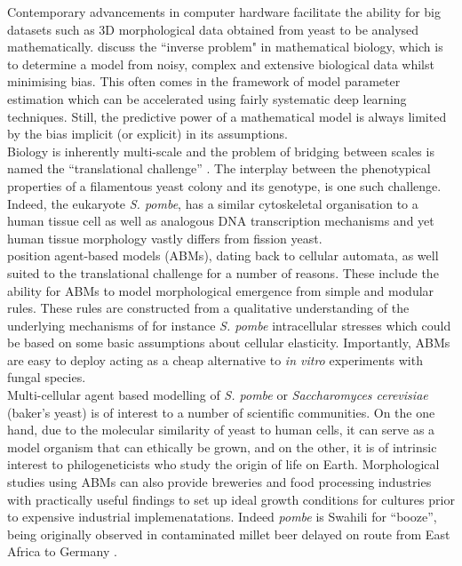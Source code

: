 Contemporary advancements in computer hardware facilitate 
the ability for big datasets such as 3D morphological data 
obtained from yeast to be analysed mathematically. \cite{clermont2015inverse} 
discuss the ``inverse problem" in mathematical biology, which is to determine a model 
from noisy, complex and extensive biological data whilst minimising bias. This often 
comes in the framework of model parameter estimation which 
can be accelerated using fairly systematic deep learning techniques. Still, the predictive power
of a mathematical model is always limited by the bias implicit (or explicit) in its assumptions.
\\

Biology is inherently multi-scale and the problem 
of bridging between scales is named the ``translational challenge'' \cite{an2009agent}.
The interplay between the phenotypical properties of a filamentous yeast colony and 
its genotype, is one such challenge. Indeed, the eukaryote \textit{S. pombe}, has a similar 
cytoskeletal organisation to a human tissue cell as well as analogous DNA transcription mechanisms 
\cite{hoffman2015ancient} and yet human tissue 
morphology vastly differs from fission yeast.
\\

\cite{an2009agent} position agent-based models (ABMs), dating back to cellular automata, as well suited to the 
translational challenge for a number of reasons. These include the ability 
for ABMs to model morphological emergence from simple and modular rules. These rules 
are constructed from a qualitative understanding of the underlying mechanisms of for instance 
\textit{S. pombe} intracellular stresses which could be based on some basic assumptions
about cellular elasticity. Importantly, ABMs are easy to deploy acting 
as a cheap alternative to \textit{in vitro} experiments with fungal species.
\\

Multi-cellular agent based modelling of \textit{S. pombe} or
\textit{Saccharomyces cerevisiae} (baker's yeast) is of interest to a number of scientific  
communities. On the one hand, due to the molecular similarity of yeast to human 
cells, it can serve as a model organism that can ethically be grown, and on 
the other, it is of intrinsic interest to philogeneticists who study the origin 
of life on Earth. Morphological studies using ABMs can also provide breweries and 
food processing industries with practically useful findings to 
set up ideal growth conditions for cultures prior to expensive 
industrial implemenatations. Indeed \textit{pombe} is Swahili 
for ``booze'', being originally observed in contaminated 
millet beer delayed on route from East Africa to Germany \cite{hayles2018introduction}.
\\


